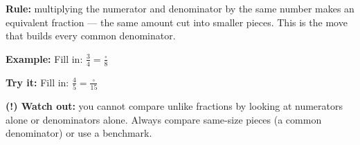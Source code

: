 \documentclass[12pt]{article}
\begin{document}

\begin{formulabox}
\textbf{Rule:} multiplying the numerator and denominator by the same number
makes an equivalent fraction --- the same amount cut into smaller pieces.
This is the move that builds every common denominator.
\end{formulabox}

\begin{examplebox}
\textbf{Example:} \quad Fill in: $\tfrac{3}{4} = \tfrac{\square}{8}$
\end{examplebox}

\begin{tryitbox}
\textbf{Try it:} \quad Fill in: $\tfrac{4}{5} = \tfrac{\square}{15}$\\[2pt]
\end{tryitbox}

\begin{watchoutbox}
\textbf{(!) Watch out:} you cannot compare unlike fractions by looking at
numerators alone or denominators alone. Always compare same-size pieces (a
common denominator) or use a benchmark.
\end{watchoutbox}
\end{document}
